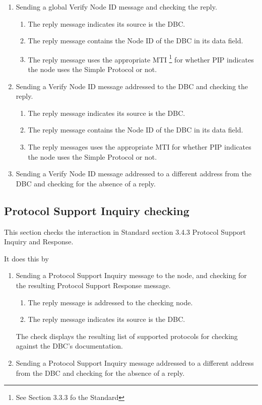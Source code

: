 \documentclass[11pt]{article}
\begin{document}
\begin{enumerate}
\item Sending a global Verify Node ID message and checking the reply.
    \begin{enumerate}
    \item The reply message indicates its source is the DBC.
    \item The reply message contains the Node ID of the DBC in its data field.
    \item The reply message uses the appropriate MTI
            \footnote{See Section 3.3.3 fo the Standard}
            for whether PIP indicates the node 
            uses the Simple Protocol or not.
    \end{enumerate}

\item Sending a Verify Node ID message addressed to the DBC and checking the reply.
    \begin{enumerate}
    \item The reply message indicates its source is the DBC.
    \item The reply message contains the Node ID of the DBC in its data field.
    \item The reply messages uses the appropriate MTI for whether PIP indicates the node 
            uses the Simple Protocol or not.
    \end{enumerate}

\item Sending a Verify Node ID message addressed to a different address from the DBC
        and checking for the absence of a reply.
\end{enumerate}

\subsection{Protocol Support Inquiry checking}

This section checks the interaction in Standard section 3.4.3 Protocol Support Inquiry and Response.

It does this by 
\begin{enumerate}
\item Sending a Protocol Support Inquiry message to the node, 
and checking for the resulting Protocol Support Response message.  
    \begin{enumerate}
    \item The reply message is addressed to the checking node.
    \item The reply message indicates its source is the DBC.
    \end{enumerate}
The check displays the resulting list of supported protocols for checking against the 
DBC's documentation.

\item Sending a Protocol Support Inquiry message addressed to a different address from the DBC
        and checking for the absence of a reply.
\end{enumerate}
\end{document}

